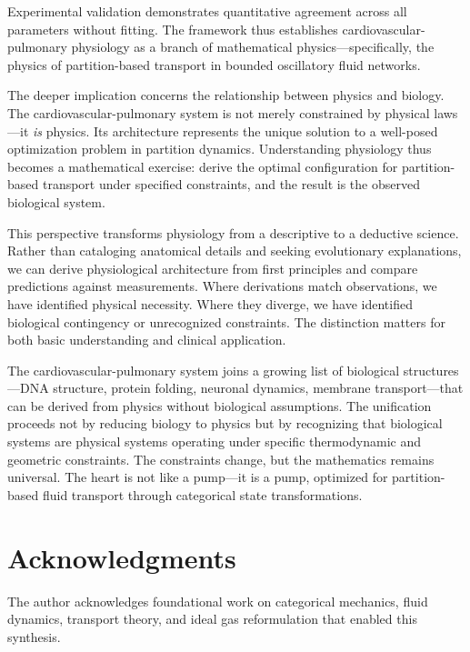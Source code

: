 \documentclass[12pt,a4paper]{article}
\theoremstyle{remark}
\begin{document}
Experimental validation demonstrates quantitative agreement across all parameters without fitting. The framework thus establishes cardiovascular-pulmonary physiology as a branch of mathematical physics—specifically, the physics of partition-based transport in bounded oscillatory fluid networks.

The deeper implication concerns the relationship between physics and biology. The cardiovascular-pulmonary system is not merely constrained by physical laws—it \textit{is} physics. Its architecture represents the unique solution to a well-posed optimization problem in partition dynamics. Understanding physiology thus becomes a mathematical exercise: derive the optimal configuration for partition-based transport under specified constraints, and the result is the observed biological system.

This perspective transforms physiology from a descriptive to a deductive science. Rather than cataloging anatomical details and seeking evolutionary explanations, we can derive physiological architecture from first principles and compare predictions against measurements. Where derivations match observations, we have identified physical necessity. Where they diverge, we have identified biological contingency or unrecognized constraints. The distinction matters for both basic understanding and clinical application.

The cardiovascular-pulmonary system joins a growing list of biological structures—DNA structure, protein folding, neuronal dynamics, membrane transport—that can be derived from physics without biological assumptions. The unification proceeds not by reducing biology to physics but by recognizing that biological systems are physical systems operating under specific thermodynamic and geometric constraints. The constraints change, but the mathematics remains universal. The heart is not like a pump—it is a pump, optimized for partition-based fluid transport through categorical state transformations.

\section*{Acknowledgments}

The author acknowledges foundational work on categorical mechanics, fluid dynamics, transport theory, and ideal gas reformulation that enabled this synthesis.



\end{document}
